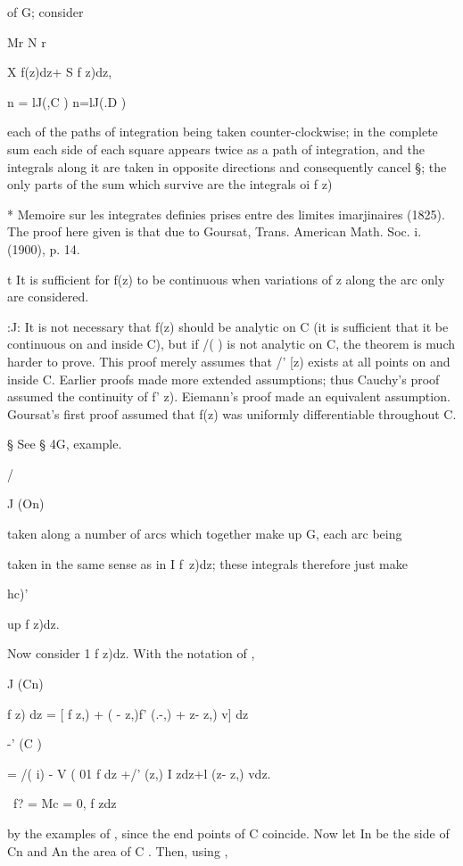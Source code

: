 of G; consider

Mr N r

X f(z)dz+ S f z)dz,

n = lJ(,C ) n=lJ(.D )

each of the paths of integration being taken counter-clockwise; in
the complete sum each side of each square appears twice as a path of
integration, and the integrals along it are taken in opposite
directions and consequently cancel §; the only parts of the sum which
survive are the integrals oi f z)

* Memoire sur les integrates definies prises entre des limites
imarjinaires (1825). The proof here given is that due to Goursat,
Trans. American Math. Soc. i. (1900), p. 14.

t It is sufficient for f(z) to be continuous when variations of z
along the arc only are considered.

:J: It is not necessary that f(z) should be analytic on C (it is
sufficient that it be continuous on and inside C), but if /( ) is not
analytic on C, the theorem is much harder to prove. This proof merely
assumes that /' [z) exists at all points on and inside C. Earlier
proofs made more extended assumptions; thus Cauchy's proof assumed the
continuity of f' z). Eiemann's proof made an equivalent assumption.
Goursat's first proof assumed that f(z) was uniformly differentiable
throughout C.

§ See § 4G, example.

/

J (On)

%
%

taken along a number of arcs which together make up G, each arc being

taken in the same sense as in I f\ z)dz; these integrals therefore
just make

hc)'

up f z)dz.

Now consider 1 f z)dz. With the notation of ,

J (Cn)

f z) dz = [ f z,) + ( - z,)f' (.-,) + z- z,) v] dz

-' (C )

= /( i) - V ( 01 f dz +/' (z,) I zdz+l (z- z,) vdz.

\ f? = Mc = 0, f zdz

by the examples of , since the end points of C coincide. Now let
In be the side of Cn and An the area of C . Then, using ,

